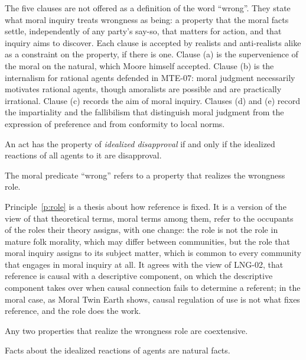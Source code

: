\documentclass{situationist-preprint}
\begin{document}
The five clauses are not offered as a definition of the word \enquote{wrong}. They state what moral inquiry treats wrongness as being: a property that the moral facts settle, independently of any party's say-so, that matters for action, and that inquiry aims to discover. Each clause is accepted by realists and anti-realists alike as a constraint on the property, if there is one. Clause (a) is the supervenience of the moral on the natural, which Moore himself accepted. Clause (b) is the internalism for rational agents defended in MTE-07: moral judgment necessarily motivates rational agents, though amoralists are possible and are practically irrational. Clause (c) records the aim of moral inquiry. Clauses (d) and (e) record the impartiality and the fallibilism that distinguish moral judgment from the expression of preference and from conformity to local norms.

\begin{definition}\label{d:idis}
An act has the property of \emph{idealized disapproval} if and only if the idealized reactions of all agents to it are disapproval.
\end{definition}

\begin{principle}\label{p:role}
The moral predicate \enquote{wrong} refers to a property that realizes the wrongness role.
\end{principle}

Principle~\ref{p:role} is a thesis about how reference is fixed. It is a version of the view of \citet{Jackson1998} that theoretical terms, moral terms among them, refer to the occupants of the roles their theory assigns, with one change: the role is not the role in mature folk morality, which may differ between communities, but the role that moral inquiry assigns to its subject matter, which is common to every community that engages in moral inquiry at all. It agrees with the view of LNG-02, that reference is causal with a descriptive component, on which the descriptive component takes over when causal connection fails to determine a referent; in the moral case, as Moral Twin Earth shows, causal regulation of use is not what fixes reference, and the role does the work.

\begin{assumption}[Uniqueness]\label{a:unique}
Any two properties that realize the wrongness role are coextensive.
\end{assumption}

\begin{assumption}[Naturalness]\label{a:nat}
Facts about the idealized reactions of agents are natural facts.
\end{assumption}
\end{document}
